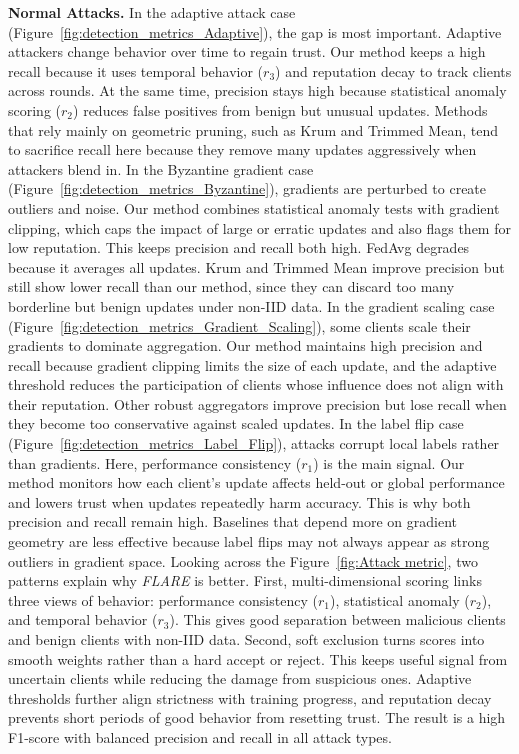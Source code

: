 \documentclass[lettersize,journal]{IEEEtran}
\begin{document}
{\textbf{Normal Attacks.} In the adaptive attack case (Figure~\ref{fig:detection_metrics_Adaptive}), the gap is most important. Adaptive attackers change behavior over time to regain trust. Our method keeps a high recall because it uses temporal behavior ($r_3$) and reputation decay to track clients across rounds. At the same time, precision stays high because statistical anomaly scoring ($r_2$) reduces false positives from benign but unusual updates. Methods that rely mainly on geometric pruning, such as Krum and Trimmed Mean, tend to sacrifice recall here because they remove many updates aggressively when attackers blend in.
In the Byzantine gradient case (Figure~\ref{fig:detection_metrics_Byzantine}), gradients are perturbed to create outliers and noise. Our method combines statistical anomaly tests with gradient clipping, which caps the impact of large or erratic updates and also flags them for low reputation. This keeps precision and recall both high. FedAvg degrades because it averages all updates. Krum and Trimmed Mean improve precision but still show lower recall than our method, since they can discard too many borderline but benign updates under non-IID data.
In the gradient scaling case (Figure~\ref{fig:detection_metrics_Gradient_Scaling}), some clients scale their gradients to dominate aggregation. Our method maintains high precision and recall because gradient clipping limits the size of each update, and the adaptive threshold reduces the participation of clients whose influence does not align with their reputation. Other robust aggregators improve precision but lose recall when they become too conservative against scaled updates.
In the label flip case (Figure~\ref{fig:detection_metrics_Label_Flip}), attacks corrupt local labels rather than gradients. Here, performance consistency ($r_1$) is the main signal. Our method monitors how each client’s update affects held-out or global performance and lowers trust when updates repeatedly harm accuracy. This is why both precision and recall remain high. Baselines that depend more on gradient geometry are less effective because label flips may not always appear as strong outliers in gradient space.
Looking across the Figure~\ref{fig:Attack metric}, two patterns explain why \textit{FLARE} is better. First, multi-dimensional scoring links three views of behavior: performance consistency ($r_1$), statistical anomaly ($r_2$), and temporal behavior ($r_3$). This gives good separation between malicious clients and benign clients with non-IID data. Second, soft exclusion turns scores into smooth weights rather than a hard accept or reject. This keeps useful signal from uncertain clients while reducing the damage from suspicious ones. Adaptive thresholds further align strictness with training progress, and reputation decay prevents short periods of good behavior from resetting trust. The result is a high F1-score with balanced precision and recall in all attack types.

}
\end{document}
